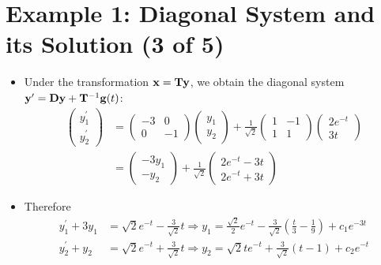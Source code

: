 \documentclass[11pt,a4paper]{article}
\begin{document}
	\section*{Example 1: Diagonal System and its Solution (3 of 5)}
	\begin{itemize}
		\item Under the transformation $\vb{x} = \vb{Ty}$, we obtain the diagonal system $\vb{y}^\prime = \vb{Dy} + \vb{T}^{-1}\vb{g}(t)$:
		\begin{align*}
			\begin{pmatrix}
				y_1^\prime\\
				y_2^\prime
			\end{pmatrix} &=
			\begin{pmatrix}
				-3 & 0\\
				0 & -1
			\end{pmatrix}
			\begin{pmatrix}
				y_1\\
				y_2
			\end{pmatrix} + \frac{1}{\sqrt{2}}
			\begin{pmatrix}
				1 & -1\\
				1 & 1
			\end{pmatrix}
			\begin{pmatrix}
				2e^{-t}\\
				3t
			\end{pmatrix}\\
			&=
			\begin{pmatrix}
				-3y_1\\
				-y_2
			\end{pmatrix} + \frac{1}{\sqrt{2}}
			\begin{pmatrix}
				2e^{-t} - 3t\\
				2e^{-t} + 3t
			\end{pmatrix}
		\end{align*}
		\item Therefore
		\begin{align*}
			y_1^\prime + 3y_1 &= \sqrt{2}e^{-t} - \frac{3}{\sqrt{2}}t \Rightarrow y_1 = \frac{\sqrt{2}}{2}e^{-t}-\frac{3}{\sqrt{2}}\left(\frac{t}{3}-\frac{1}{9}\right) + c_1e^{-3t}\\
			y_2^\prime + y_2 &= \sqrt{2}e^{-t} + \frac{3}{\sqrt{2}}t \Rightarrow y_2 = \sqrt{2}te^{-t}+\frac{3}{\sqrt{2}}(t-1) + c_2e^{-t}
		\end{align*}
	\end{itemize}
\end{document}
